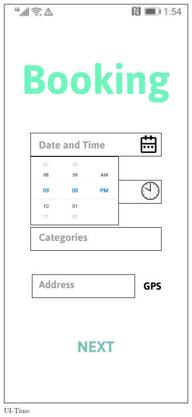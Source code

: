 \documentclass[a4paper,12pt]{report}
\begin{document}
\begin{figure}[H]
\begin{minipage}[t]{0.56\linewidth}
		\includegraphics[scale=0.5]{UI-Time}
		\caption{UI-Time}
		\label{fig:UI-Time}
	\end{minipage}
\end{figure}
\end{document}
